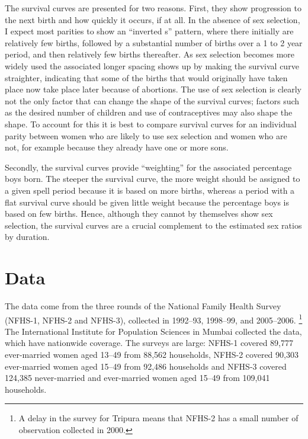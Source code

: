 \documentclass[12pt,letterpaper]{article}
\begin{document}
The survival curves are presented for two reasons.
First, they show progression to the next birth and how quickly 
it occurs, if at all.
In the absence of sex selection, I expect most parities to show an 
``inverted s'' pattern, where there initially are relatively few births, 
followed by a substantial number of births over a 1 to 2 year period, and then
relatively few births thereafter.
As sex selection becomes more widely used the associated
longer spacing shows up by making the survival curve straighter,
indicating that some of the births that would originally have taken place
now take place later because of abortions.
The use of sex selection is clearly not the only factor that can change the shape of
the survival curves; factors such as the desired number of children and
use of contraceptives may also shape the shape.
To account for this it is best to compare survival curves for an individual
parity between women who are likely to use sex selection and women who are
not, for example because they already have one or more sons.

Secondly, the survival curves provide ``weighting'' for the associated percentage 
boys born.
The steeper the survival curve, the more weight should be assigned to a given
spell period because it is based on more births, 
whereas a period with a flat survival curve should be given little weight because the 
percentage boys is based on few births.
Hence, although they cannot by themselves show sex selection, the survival
curves are a crucial complement to the estimated sex ratios by duration.


\section{Data\label{sec:data}}

The data come from the three rounds of the National Family Health Survey 
(NFHS-1, NFHS-2 and NFHS-3),
collected in 1992--93, 1998--99, and 2005--2006.%
\footnote{
A delay in the survey for Tripura means that NFHS-2 has a small number of observation 
collected in 2000.
}
The International Institute for Population Sciences in Mumbai collected the data,
which have nationwide coverage.
The surveys are large: NFHS-1 covered 89,777 ever-married women 
aged 13--49 from 88,562 households,
NFHS-2 covered 90,303 ever-married women aged 15--49 from 92,486 households
and NFHS-3 covered 124,385 never-married and ever-married women aged 
15--49 from 109,041 households.
\end{document}

